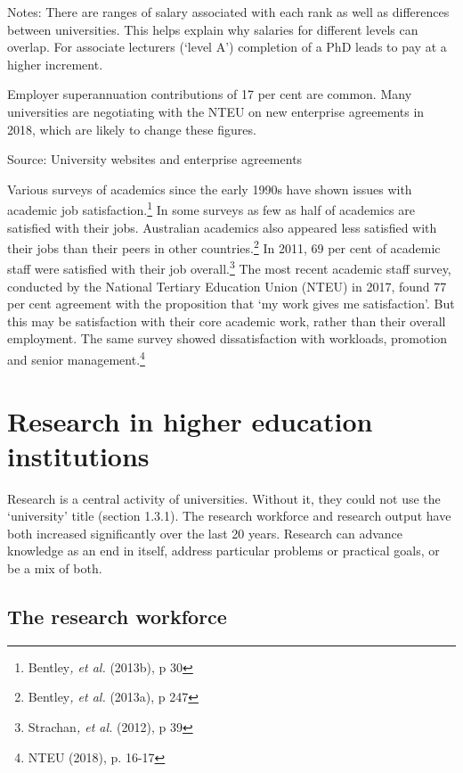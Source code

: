 \documentclass[]{book}
\begin{document}
Notes: There are ranges of salary associated with each rank as well as differences between universities. This helps explain why salaries for different levels can overlap. For associate lecturers (`level A') completion of a PhD leads to pay at a higher increment.

Employer superannuation contributions of 17 per cent are common. Many universities are negotiating with the NTEU on new enterprise agreements in 2018, which are likely to change these figures.

Source: University websites and enterprise agreements

Various surveys of academics since the early 1990s have shown issues with academic job satisfaction.\footnote{Bentley\emph{, et al.} (2013b), p 30} In some surveys as few as half of academics are satisfied with their jobs. Australian academics also appeared less satisfied with their jobs than their peers in other countries.\footnote{Bentley\emph{, et al.} (2013a), p 247} In 2011, 69 per cent of academic staff were satisfied with their job overall.\footnote{Strachan\emph{, et al.} (2012), p 39} The most recent academic staff survey, conducted by the National Tertiary Education Union (NTEU) in 2017, found 77 per cent agreement with the proposition that `my work gives me satisfaction'. But this may be satisfaction with their core academic work, rather than their overall employment. The same survey showed dissatisfaction with workloads, promotion and senior management.\footnote{NTEU (2018), p. 16-17}

\hypertarget{section-7}{%
\chapter{}\label{section-7}}

\hypertarget{research-in-higher-education-institutions}{%
\chapter{Research in higher education institutions }\label{research-in-higher-education-institutions}}

Research is a central activity of universities. Without it, they could not use the `university' title (section 1.3.1). The research workforce and research output have both increased significantly over the last 20 years. Research can advance knowledge as an end in itself, address particular problems or practical goals, or be a mix of both.

\hypertarget{the-research-workforce}{%
\section{The research workforce}\label{the-research-workforce}}
\end{document}
